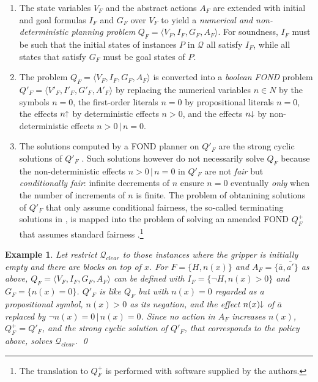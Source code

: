 \documentclass[letterpaper]{article} %
\newcommand{\tup}[1]{\langle #1 \rangle}
\newtheorem{example}[definition]{Example}
\newcommand{\Q}{\mathcal{Q}}
\newcommand{\pplus}{\hspace{-.05em}\raisebox{.15ex}{\footnotesize$\uparrow$}}
\newcommand{\mminus}{\hspace{-.05em}\raisebox{.15ex}{\footnotesize$\downarrow$}}
\begin{document}
\begin{enumerate}[1.]
  \item The state variables $V_F$ and the abstract actions $A_F$ are
    extended with initial and goal formulas $I_F$ and $G_F$ over $V_F$
    to yield a \emph{numerical and non-deterministic planning problem}
    $Q_F=\tup{V_F,I_F,G_F,A_F}$. For soundness, $I_F$ must be such that
    the initial states of instances $P$ in $\Q$ all satisfy $I_F$, while
    all states that satisfy $G_F$ must be goal states of $P$.
%
  \item The problem $Q_F=\tup{V_F,I_F,G_F,A_F}$ is converted into a
    \emph{boolean FOND} problem $Q'_F=\tup{V'_F,I'_F,G'_F,A'_F}$ by
    replacing the numerical variables $n\in N$ by the symbols $n=0$,
    the first-order literals $n=0$ by propositional literals  $n=0$, 
    the effects $n\pplus$ by deterministic effects $n > 0$, and the
    effects $n\mminus$ by non-deterministic effects $n>0\,|\,n=0$.
%
  \item The solutions computed by a FOND planner on $Q'_F$ are the
    strong cyclic solutions of $Q'_F$ \cite{strong-cyclic}.
    Such solutions however do not necessarily solve $Q_F$ because the
    non-deterministic effects $n>0\,|\,n=0$ in $Q'_F$ are not \emph{fair} but
    \emph{conditionally fair}: infinite decrements of $n$ ensure
    $n=0$ eventually \emph{only} when the number of increments of $n$ is finite.
    The problem of obtanining solutions of $Q'_F$ that only assume conditional
    fairness, the so-called terminating solutions in \cite{srivastava:aaai2011},
    is mapped into the problem of solving an amended FOND $Q^+_F$ that
     assumes standard  fairness \cite{bonet:ijcai2017}.\footnote{The
    translation to $Q^+_F$ is performed with software supplied by the authors.}
\end{enumerate}


\begin{example}
  Let restrict  $\Q_{clear}$  to those  instances where  the gripper is initially empty
  and there are blocks on top of $x$. For $F=\{H,n(x)\}$  and $A_F=\{\bar{a},\bar{a'}\}$ as above, 
  $Q_F=\tup{V_F,I_F,G_F,A_F}$ can be defined with $I_F=\{\neg H, n(x) > 0\}$ and $G_F=\{n(x)=0\}$.
  $Q'_F$ is like $Q_F$ but with $n(x)=0$ regarded as a propositional symbol, $n(x) > 0$
  as its negation, and the effect $n(x)\mminus$ of  $\bar{a}$ replaced by  $\neg n(x)=0 \, | \, n(x)=0$.
  Since  no action in $A_F$  increases $n(x)$,   $Q^+_F=Q'_F$, and the strong cyclic solution  of $Q'_F$,
  that corresponds to the policy above, solves $\Q_{clear}$. \qed
\end{example}
\end{document}
